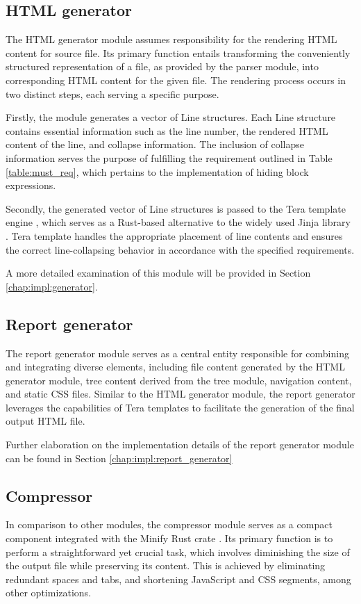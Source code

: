 \subsection{HTML generator}
\label{chap:modules:generator}

The HTML generator module assumes responsibility for the rendering HTML content for source file. Its primary function entails transforming the conveniently structured representation of a file, as provided by the parser module, into corresponding HTML content for the given file. The rendering process occurs in two distinct steps, each serving a specific purpose.

Firstly, the module generates a vector of Line structures. Each Line structure contains essential information such as the line number, the rendered HTML content of the line, and collapse information. The inclusion of collapse information serves the purpose of fulfilling the requirement outlined in Table \ref{table:must_req}, which pertains to the implementation of hiding block expressions.

Secondly, the generated vector of Line structures is passed to the Tera template engine \cite{tera-official}, which serves as a Rust-based alternative to the widely used Jinja library \cite{jinja-official}. Tera template handles the appropriate placement of line contents and ensures the correct line-collapsing behavior in accordance with the specified requirements.

A more detailed examination of this module will be provided in Section \ref{chap:impl:generator}.

\subsection{Report generator}
\label{chap:modules:report_generator}

The report generator module serves as a central entity responsible for combining and integrating diverse elements, including file content generated by the HTML generator module, tree content derived from the tree module, navigation content, and static CSS files. Similar to the HTML generator module, the report generator leverages the capabilities of Tera templates to facilitate the generation of the final output HTML file.

Further elaboration on the implementation details of the report generator module can be found in Section \ref{chap:impl:report_generator}


\subsection{Compressor}
\label{chap:modules:compressor}
In comparison to other modules, the compressor module serves as a compact component integrated with the Minify Rust crate \cite{minify-github}. Its primary function is to perform a straightforward yet crucial task, which involves diminishing the size of the output file while preserving its content. This is achieved by eliminating redundant spaces and tabs, and shortening JavaScript and CSS segments, among other optimizations.

